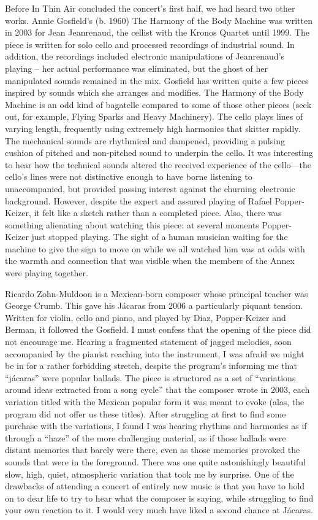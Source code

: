 Before In Thin Air concluded the concert’s first half, we had heard two other works. Annie Gosfield’s (b. 1960) The Harmony of the Body Machine was written in 2003 for Jean Jeanrenaud, the cellist with the Kronos Quartet until 1999. The piece is written for solo cello and processed recordings of industrial sound. In addition, the recordings included electronic manipulations of Jeanrenaud’s playing – her actual performance was eliminated, but the ghost of her manipulated sounds remained in the mix. Gosfield has written quite a few pieces inspired by sounds which she arranges and modifies. The Harmony of the Body Machine is an odd kind of bagatelle compared to some of those other pieces (seek out, for example, Flying Sparks and Heavy Machinery). The cello plays lines of varying length, frequently using extremely high harmonics that skitter rapidly. The mechanical sounds are rhythmical and dampened, providing a pulsing cushion of pitched and non-pitched sound to underpin the cello. It was interesting to hear how the technical sounds altered the received experience of the cello—the cello’s lines were not distinctive enough to have borne listening to unaccompanied, but provided passing interest against the churning electronic background. However, despite the expert and assured playing of Rafael Popper-Keizer, it felt like a sketch rather than a completed piece. Also, there was something alienating about watching this piece: at several moments Popper-Keizer just stopped playing. The sight of a human musician waiting for the machine to give the sign to move on while we all watched him was at odds with the warmth and connection that was visible when the members of the Annex were playing together.

Ricardo Zohn-Muldoon is a Mexican-born composer whose principal teacher was George Crumb. This gave his Jácaras from 2006 a particularly piquant tension. Written for violin, cello and piano, and played by Diaz, Popper-Keizer and Berman, it followed the Gosfield. I must confess that the opening of the piece did not encourage me. Hearing a fragmented statement of jagged melodies, soon accompanied by the pianist reaching into the instrument, I was afraid we might be in for a rather forbidding stretch, despite the program’s informing me that “jácaras” were popular ballads. The piece is structured as a set of “variations around ideas extracted from a song cycle” that the composer wrote in 2003, each variation titled with the Mexican popular form it was meant to evoke (alas, the program did not offer us these titles). After struggling at first to find some purchase with the variations, I found I was hearing rhythms and harmonies as if through a “haze” of the more challenging material, as if those ballads were distant memories that barely were there, even as those memories provoked the sounds that were in the foreground. There was one quite astonishingly beautiful slow, high, quiet, atmospheric variation that took me by surprise. One of the drawbacks of attending a concert of entirely new music is that you have to hold on to dear life to try to hear what the composer is saying, while struggling to find your own reaction to it. I would very much have liked a second chance at Jácaras.

